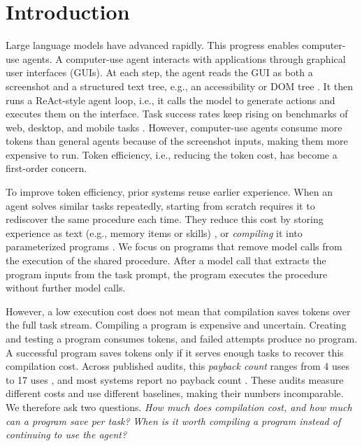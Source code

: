 

\section{Introduction}
\label{sec:intro}

Large language models have advanced rapidly.
This progress enables computer-use agents.
A computer-use agent interacts with applications through graphical user interfaces (GUIs).
At each step, the agent reads the GUI as both a screenshot and a structured text tree, e.g., an accessibility or DOM tree \citep{hong2024cogagent,zhang2025ufo}.
It then runs a ReAct-style \citep{yao2023react} agent loop, i.e., it calls the model to generate actions and executes them on the interface.
Task success rates keep rising on benchmarks of web, desktop, and mobile tasks \citep{xie2024osworld,rawles2025androidworld}.
However, computer-use agents consume more tokens than general agents because of the screenshot inputs, making them more expensive to run.
Token efficiency, i.e., reducing the token cost, has become a first-order concern.

To improve token efficiency, prior systems reuse earlier experience.
When an agent solves similar tasks repeatedly, starting from scratch requires it to rediscover the same procedure each time.
They reduce this cost by storing experience as text (e.g., memory items or skills) \citep{wang2025awm,zheng2024synapse}, or \textit{compiling} it into parameterized programs \citep{wang2025asi,li2026preact,chen2026autorpa,elyadouni2026tracecompiler}.
We focus on programs that remove model calls from the execution of the shared procedure.
After a model call that extracts the program inputs from the task prompt, the program executes the procedure without further model calls.

However, a low execution cost does not mean that compilation saves tokens over the full task stream.
Compiling a program is expensive and uncertain.
Creating and testing a program consumes tokens, and failed attempts produce no program.
A successful program saves tokens only if it serves enough tasks to recover this compilation cost.
Across published audits, this \emph{payback count} ranges from 4 uses \citep{chen2026autorpa} to 17 uses \citep{trooskens2026compiledai}, and most systems report no payback count \citep{elyadouni2026tracecompiler,xu2026skillsmith}.
These audits measure different costs and use different baselines, making their numbers incomparable.
We therefore ask two questions.
\emph{How much does compilation cost, and how much can a program save per task?}
\emph{When is it worth compiling a program instead of continuing to use the agent?}

